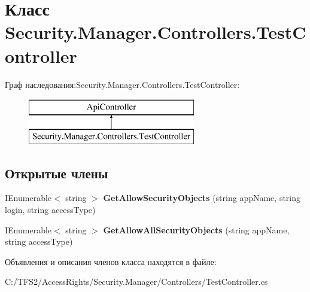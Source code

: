 \hypertarget{class_security_1_1_manager_1_1_controllers_1_1_test_controller}{}\section{Класс Security.\+Manager.\+Controllers.\+Test\+Controller}
\label{class_security_1_1_manager_1_1_controllers_1_1_test_controller}
Граф наследования\+:Security.\+Manager.\+Controllers.\+Test\+Controller\+:\begin{figure}[H]
\begin{center}
\leavevmode
\includegraphics[height=2.000000cm]{d1/d5d/class_security_1_1_manager_1_1_controllers_1_1_test_controller}
\end{center}
\end{figure}
\subsection*{Открытые члены}
\begin{DoxyCompactItemize}
\item 
\mbox{\label{class_security_1_1_manager_1_1_controllers_1_1_test_controller_aba7de1a6d8eab7d214ebb1e138d55fbc}} 
I\+Enumerable$<$ string $>$ {\bfseries Get\+Allow\+Security\+Objects} (string app\+Name, string login, string access\+Type)
\item 
\mbox{\label{class_security_1_1_manager_1_1_controllers_1_1_test_controller_a6b463d592af99368c059d0be1fc77fe8}} 
I\+Enumerable$<$ string $>$ {\bfseries Get\+Allow\+All\+Security\+Objects} (string app\+Name, string access\+Type)
\end{DoxyCompactItemize}


Объявления и описания членов класса находятся в файле\+:\begin{DoxyCompactItemize}
\item 
C\+:/\+T\+F\+S2/\+Access\+Rights/\+Security.\+Manager/\+Controllers/Test\+Controller.\+cs\end{DoxyCompactItemize}

